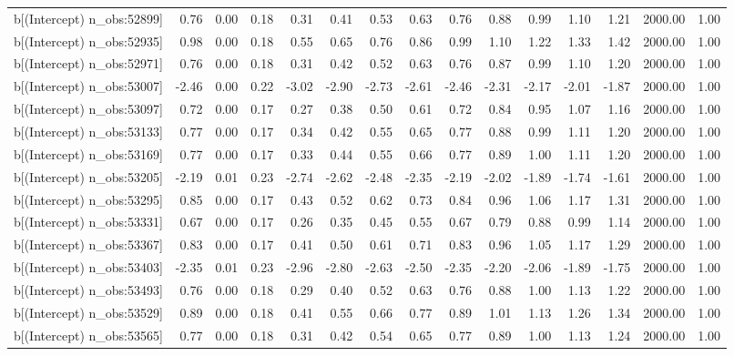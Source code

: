\begin{table}[ht]
\begin{tabular}{rrrrrrrrrrrrrrr}
  b[(Intercept) n\_obs:52899] & 0.76 & 0.00 & 0.18 & 0.31 & 0.41 & 0.53 & 0.63 & 0.76 & 0.88 & 0.99 & 1.10 & 1.21 & 2000.00 & 1.00 \\ 
  b[(Intercept) n\_obs:52935] & 0.98 & 0.00 & 0.18 & 0.55 & 0.65 & 0.76 & 0.86 & 0.99 & 1.10 & 1.22 & 1.33 & 1.42 & 2000.00 & 1.00 \\ 
  b[(Intercept) n\_obs:52971] & 0.76 & 0.00 & 0.18 & 0.31 & 0.42 & 0.52 & 0.63 & 0.76 & 0.87 & 0.99 & 1.10 & 1.20 & 2000.00 & 1.00 \\ 
  b[(Intercept) n\_obs:53007] & -2.46 & 0.00 & 0.22 & -3.02 & -2.90 & -2.73 & -2.61 & -2.46 & -2.31 & -2.17 & -2.01 & -1.87 & 2000.00 & 1.00 \\ 
  b[(Intercept) n\_obs:53097] & 0.72 & 0.00 & 0.17 & 0.27 & 0.38 & 0.50 & 0.61 & 0.72 & 0.84 & 0.95 & 1.07 & 1.16 & 2000.00 & 1.00 \\ 
  b[(Intercept) n\_obs:53133] & 0.77 & 0.00 & 0.17 & 0.34 & 0.42 & 0.55 & 0.65 & 0.77 & 0.88 & 0.99 & 1.11 & 1.20 & 2000.00 & 1.00 \\ 
  b[(Intercept) n\_obs:53169] & 0.77 & 0.00 & 0.17 & 0.33 & 0.44 & 0.55 & 0.66 & 0.77 & 0.89 & 1.00 & 1.11 & 1.20 & 2000.00 & 1.00 \\ 
  b[(Intercept) n\_obs:53205] & -2.19 & 0.01 & 0.23 & -2.74 & -2.62 & -2.48 & -2.35 & -2.19 & -2.02 & -1.89 & -1.74 & -1.61 & 2000.00 & 1.00 \\ 
  b[(Intercept) n\_obs:53295] & 0.85 & 0.00 & 0.17 & 0.43 & 0.52 & 0.62 & 0.73 & 0.84 & 0.96 & 1.06 & 1.17 & 1.31 & 2000.00 & 1.00 \\ 
  b[(Intercept) n\_obs:53331] & 0.67 & 0.00 & 0.17 & 0.26 & 0.35 & 0.45 & 0.55 & 0.67 & 0.79 & 0.88 & 0.99 & 1.14 & 2000.00 & 1.00 \\ 
  b[(Intercept) n\_obs:53367] & 0.83 & 0.00 & 0.17 & 0.41 & 0.50 & 0.61 & 0.71 & 0.83 & 0.96 & 1.05 & 1.17 & 1.29 & 2000.00 & 1.00 \\ 
  b[(Intercept) n\_obs:53403] & -2.35 & 0.01 & 0.23 & -2.96 & -2.80 & -2.63 & -2.50 & -2.35 & -2.20 & -2.06 & -1.89 & -1.75 & 2000.00 & 1.00 \\ 
  b[(Intercept) n\_obs:53493] & 0.76 & 0.00 & 0.18 & 0.29 & 0.40 & 0.52 & 0.63 & 0.76 & 0.88 & 1.00 & 1.13 & 1.22 & 2000.00 & 1.00 \\ 
  b[(Intercept) n\_obs:53529] & 0.89 & 0.00 & 0.18 & 0.41 & 0.55 & 0.66 & 0.77 & 0.89 & 1.01 & 1.13 & 1.26 & 1.34 & 2000.00 & 1.00 \\ 
  b[(Intercept) n\_obs:53565] & 0.77 & 0.00 & 0.18 & 0.31 & 0.42 & 0.54 & 0.65 & 0.77 & 0.89 & 1.00 & 1.13 & 1.24 & 2000.00 & 1.00 \\ 

\end{tabular}
\end{table}
